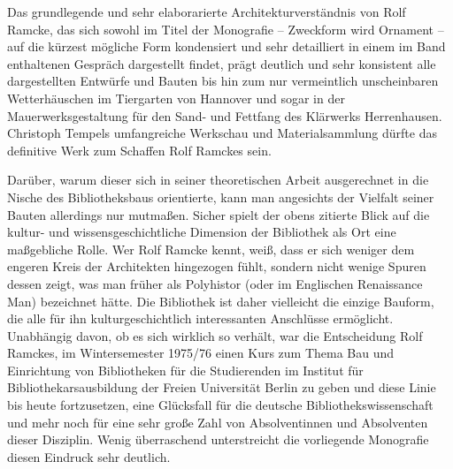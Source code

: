 \documentclass[a4paper,
fontsize=11pt,
oneside,
numbers=noperiodatend,
parskip=half-,
bibliography=totoc,
final
]{scrartcl}
\begin{document}
Das grundlegende und sehr elaborarierte Architekturverständnis von Rolf
Ramcke, das sich sowohl im Titel der Monografie -- Zweckform wird
Ornament -- auf die kürzest mögliche Form kondensiert und sehr
detailliert in einem im Band enthaltenen Gespräch dargestellt findet,
prägt deutlich und sehr konsistent alle dargestellten Entwürfe und
Bauten bis hin zum nur vermeintlich unscheinbaren Wetterhäuschen im
Tiergarten von Hannover und sogar in der Mauerwerksgestaltung für den
Sand- und Fettfang des Klärwerks Herrenhausen. Christoph Tempels
umfangreiche Werkschau und Materialsammlung dürfte das definitive Werk
zum Schaffen Rolf Ramckes sein.

Darüber, warum dieser sich in seiner theoretischen Arbeit ausgerechnet
in die Nische des Bibliotheksbaus orientierte, kann man angesichts der
Vielfalt seiner Bauten allerdings nur mutmaßen. Sicher spielt der obens
zitierte Blick auf die kultur- und wissensgeschichtliche Dimension der
Bibliothek als Ort eine maßgebliche Rolle. Wer Rolf Ramcke kennt, weiß,
dass er sich weniger dem engeren Kreis der Architekten hingezogen fühlt,
sondern nicht wenige Spuren dessen zeigt, was man früher als Polyhistor
(oder im Englischen Renaissance Man) bezeichnet hätte. Die Bibliothek
ist daher vielleicht die einzige Bauform, die alle für ihn
kulturgeschichtlich interessanten Anschlüsse ermöglicht. Unabhängig
davon, ob es sich wirklich so verhält, war die Entscheidung Rolf
Ramckes, im Wintersemester 1975/76 einen Kurs zum Thema Bau und
Einrichtung von Bibliotheken für die Studierenden im Institut für
Bibliothekarsausbildung der Freien Universität Berlin zu geben und diese
Linie bis heute fortzusetzen, eine Glücksfall für die deutsche
Bibliothekswissenschaft und mehr noch für eine sehr große Zahl von
Absolventinnen und Absolventen dieser Disziplin. Wenig überraschend
unterstreicht die vorliegende Monografie diesen Eindruck sehr deutlich.

\end{document}

